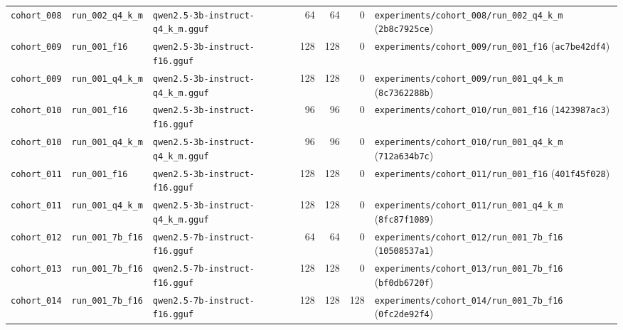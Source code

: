 {\begin{longtable}{@{}>{\raggedright\arraybackslash}p{1.5cm}>{\raggedright\arraybackslash}p{2.7cm}>{\raggedright\arraybackslash}p{3.2cm}rrr>{\raggedright\arraybackslash}p{4.2cm}@{}}
\texttt{cohort\_008} & \texttt{run\_002\_q4\_k\_m} & \texttt{qwen2.5-\allowbreak{}3b-\allowbreak{}instruct-\allowbreak{}q4\_k\_m.gguf} & 64 & 64 & 0 & \texttt{experiments/\allowbreak{}cohort\_008/\allowbreak{}run\_002\_q4\_k\_m} (\texttt{2b8c7925ce}) \\
\texttt{cohort\_009} & \texttt{run\_001\_f16} & \texttt{qwen2.5-\allowbreak{}3b-\allowbreak{}instruct-\allowbreak{}f16.gguf} & 128 & 128 & 0 & \texttt{experiments/\allowbreak{}cohort\_009/\allowbreak{}run\_001\_f16} (\texttt{ac7be42df4}) \\
\texttt{cohort\_009} & \texttt{run\_001\_q4\_k\_m} & \texttt{qwen2.5-\allowbreak{}3b-\allowbreak{}instruct-\allowbreak{}q4\_k\_m.gguf} & 128 & 128 & 0 & \texttt{experiments/\allowbreak{}cohort\_009/\allowbreak{}run\_001\_q4\_k\_m} (\texttt{8c7362288b}) \\
\texttt{cohort\_010} & \texttt{run\_001\_f16} & \texttt{qwen2.5-\allowbreak{}3b-\allowbreak{}instruct-\allowbreak{}f16.gguf} & 96 & 96 & 0 & \texttt{experiments/\allowbreak{}cohort\_010/\allowbreak{}run\_001\_f16} (\texttt{1423987ac3}) \\
\texttt{cohort\_010} & \texttt{run\_001\_q4\_k\_m} & \texttt{qwen2.5-\allowbreak{}3b-\allowbreak{}instruct-\allowbreak{}q4\_k\_m.gguf} & 96 & 96 & 0 & \texttt{experiments/\allowbreak{}cohort\_010/\allowbreak{}run\_001\_q4\_k\_m} (\texttt{712a634b7c}) \\
\texttt{cohort\_011} & \texttt{run\_001\_f16} & \texttt{qwen2.5-\allowbreak{}3b-\allowbreak{}instruct-\allowbreak{}f16.gguf} & 128 & 128 & 0 & \texttt{experiments/\allowbreak{}cohort\_011/\allowbreak{}run\_001\_f16} (\texttt{401f45f028}) \\
\texttt{cohort\_011} & \texttt{run\_001\_q4\_k\_m} & \texttt{qwen2.5-\allowbreak{}3b-\allowbreak{}instruct-\allowbreak{}q4\_k\_m.gguf} & 128 & 128 & 0 & \texttt{experiments/\allowbreak{}cohort\_011/\allowbreak{}run\_001\_q4\_k\_m} (\texttt{8fc87f1089}) \\
\texttt{cohort\_012} & \texttt{run\_001\_7b\_f16} & \texttt{qwen2.5-\allowbreak{}7b-\allowbreak{}instruct-\allowbreak{}f16.gguf} & 64 & 64 & 0 & \texttt{experiments/\allowbreak{}cohort\_012/\allowbreak{}run\_001\_7b\_f16} (\texttt{10508537a1}) \\
\texttt{cohort\_013} & \texttt{run\_001\_7b\_f16} & \texttt{qwen2.5-\allowbreak{}7b-\allowbreak{}instruct-\allowbreak{}f16.gguf} & 128 & 128 & 0 & \texttt{experiments/\allowbreak{}cohort\_013/\allowbreak{}run\_001\_7b\_f16} (\texttt{bf0db6720f}) \\
\texttt{cohort\_014} & \texttt{run\_001\_7b\_f16} & \texttt{qwen2.5-\allowbreak{}7b-\allowbreak{}instruct-\allowbreak{}f16.gguf} & 128 & 128 & 128 & \texttt{experiments/\allowbreak{}cohort\_014/\allowbreak{}run\_001\_7b\_f16} (\texttt{0fc2de92f4}) \\

\end{longtable}}
